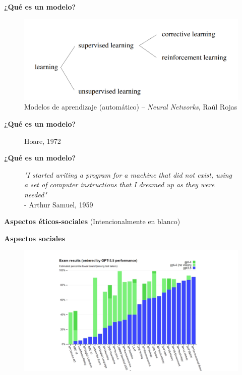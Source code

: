 \documentclass{beamer}
\begin{document}
\begin{frame}{\bfseries ¿Qué es un modelo?}
    \begin{figure}
        \centering
        \includegraphics[width=0.75\linewidth]{learning.png}
        \captionsetup{labelformat=empty}
        \caption{Modelos de aprendizaje (automático) -- \textit{Neural Networks}, Raúl Rojas}
    \end{figure}
\end{frame}

\begin{frame}{\textbf{¿Qué es un modelo?}}

\begin{figure}[htbp]
    \centering
    
    \captionsetup{labelformat=empty}
    \caption{Hoare, 1972}
\end{figure}


\end{frame}

\begin{frame}{\textbf{¿Qué es un modelo?}}
\begin{figure}[htbp]
\centering
 \textit{"I started writing a program for a machine that did not exist, using a set of computer instructions that I dreamed up as they were needed"} \\
- Arthur Samuel, 1959
\end{figure}
\end{frame}

\begin{frame}{\bfseries Aspectos éticos-sociales}
\centering (Intencionalmente en blanco)
\end{frame}

\begin{frame}{\bfseries Aspectos sociales}
    \begin{figure}
        \centering
        \includegraphics[width=1\linewidth]{tests-1.png}
        \captionsetup{labelformat=empty}
    \end{figure}
\end{frame}
\end{document}
